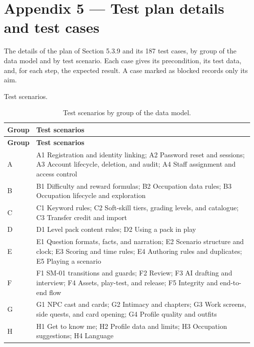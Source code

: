 \newpage
\section*{Appendix 5 --- Test plan details and test cases}

The details of the plan of Section 5.3.9 and its 187 test cases, by group of the data model and by test scenario. Each case gives its precondition, its test data, and, for each step, the expected result. A case marked as blocked records only its aim.

Test scenarios.

{\small{}\renewcommand{\arraystretch}{1.1}
\begin{longtable}{|>{\raggedright\arraybackslash}p{}|>{\raggedright\arraybackslash}p{}|}
\caption{Test scenarios by group of the data model.} \\
\hline
\textbf{Group} & \textbf{Test scenarios} \\ \hline
\endfirsthead
\hline
\textbf{Group} & \textbf{Test scenarios} \\ \hline
\endhead
A & A1 Registration and identity linking; A2 Password reset and sessions; A3 Account lifecycle, deletion, and audit; A4 Staff assignment and access control \\ \hline
B & B1 Difficulty and reward formulas; B2 Occupation data rules; B3 Occupation lifecycle and exploration \\ \hline
C & C1 Keyword rules; C2 Soft-skill tiers, grading levels, and catalogue; C3 Transfer credit and import \\ \hline
D & D1 Level pack content rules; D2 Using a pack in play \\ \hline
E & E1 Question formats, facts, and narration; E2 Scenario structure and clock; E3 Scoring and time rules; E4 Authoring rules and duplicates; E5 Playing a scenario \\ \hline
F & F1 SM-01 transitions and guards; F2 Review; F3 AI drafting and interview; F4 Assets, play-test, and release; F5 Integrity and end-to-end flow \\ \hline
G & G1 NPC cast and cards; G2 Intimacy and chapters; G3 Work screens, side quests, and card opening; G4 Profile quality and outfits \\ \hline
H & H1 Get to know me; H2 Profile data and limits; H3 Occupation suggestions; H4 Language \\ \hline

\end{longtable}}
